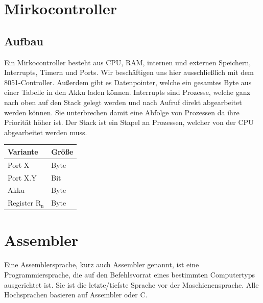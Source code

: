 \documentclass[12pt,a4paper]{article}
\begin{document}
\section{Mirkocontroller}

\subsection{Aufbau}
    Ein Mirkocontroller besteht aus CPU, RAM, internen und externen Speichern, Interrupts, Timern und Ports.
    Wir beschäftigen uns hier ausschließlich mit dem 8051-Controller.
    Außerdem gibt es Datenpointer, welche ein gesamtes Byte aus einer Tabelle in den Akku laden können.
    Interrupts sind Prozesse, welche ganz nach oben auf den Stack gelegt werden und nach Aufruf direkt abgearbeitet werden können. Sie unterbrechen damit eine Abfolge von Prozessen da ihre Priorität höher ist. Der Stack ist ein Stapel an Prozessen, welcher von der CPU abgearbeitet werden muss.
    \begin{table}[h]
    	\renewcommand{\arraystretch}{1.5}
        \centering
        \begin{tabularx}{17cm}{|X|X|}
            \hline
            \cellcolor{cyan!60!white}\textbf{Variante} &\cellcolor{cyan!60!white} \textbf{Größe}\\
            \hline
            Port X & Byte\\
            \hline
            Port X.Y & Bit\\
            \hline
            Akku & Byte\\
            \hline
            Register $\text{R}_{\text{n}}$ & Byte\\
            \hline
        \end{tabularx}
    \end{table}

\section{Assembler}
    Eine Assemblersprache, kurz auch Assembler genannt, ist eine Programmiersprache, die auf den Befehlsvorrat eines
    bestimmten Computertyps ausgerichtet ist. Sie ist die letzte/tiefste Sprache vor der Maschienensprache. Alle Hochsprachen basieren auf Assembler oder C.
\end{document}
